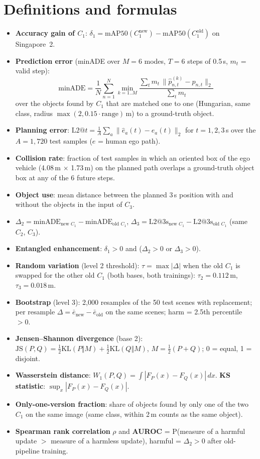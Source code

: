 \documentclass[10pt,a4paper]{article}
\begin{document}
\section{Definitions and formulas}
\begin{itemize}
\item \textbf{Accuracy gain of $C_1$}: $\delta_1 = \mathrm{mAP50}(C_1^{\text{new}}) - \mathrm{mAP50}(C_1^{\text{old}})$ on Singapore~2.
\item \textbf{Prediction error} (minADE over $M=6$ modes, $T=6$ steps of 0.5\,s, $m_t$ = valid step):
\[ \text{minADE} = \frac{1}{N}\sum_{n=1}^{N} \min_{k=1..M} \frac{\sum_t m_t \,\lVert \hat p^{(k)}_{n,t} - p_{n,t}\rVert_2}{\sum_t m_t} \]
over the objects found by $C_1$ that are matched one to one (Hungarian, same class, radius $\max(2, 0.15\cdot\text{range})$\,m) to a ground-truth object.
\item \textbf{Planning error}: $\mathrm{L2@}t = \frac{1}{A}\sum_{a} \lVert \hat e_{a}(t) - e_{a}(t) \rVert_2$ for $t = 1, 2, 3$\,s over the $A = 1{,}720$ test samples ($e$ = human ego path).
\item \textbf{Collision rate}: fraction of test samples in which an oriented box of the ego vehicle (4.08\,m $\times$ 1.73\,m) on the planned path overlaps a ground-truth object box at any of the 6 future steps.
\item \textbf{Object use}: mean distance between the planned 3\,s position with and without the objects in the input of $C_3$.
\item $\Delta_2 = \text{minADE}_{\text{new }C_1} - \text{minADE}_{\text{old }C_1}$, \quad $\Delta_3 = \text{L2@3s}_{\text{new }C_1} - \text{L2@3s}_{\text{old }C_1}$ (same $C_2$, $C_3$).
\item \textbf{Entangled enhancement}: $\delta_1 > 0$ and ($\Delta_2 > 0$ or $\Delta_3 > 0$).
\item \textbf{Random variation} (level 2 threshold): $\tau = \max |\Delta|$ when the old $C_1$ is swapped for the other old $C_1$ (both bases, both trainings): $\tau_2 = 0.112$\,m, $\tau_3 = 0.018$\,m.
\item \textbf{Bootstrap} (level 3): 2{,}000 resamples of the 50 test scenes with replacement; per resample $\Delta = \bar{e}_{\text{new}} - \bar{e}_{\text{old}}$ on the same scenes; harm = 2.5th percentile $> 0$.
\item \textbf{Jensen--Shannon divergence} (base 2): $\mathrm{JS}(P,Q) = \tfrac12 \mathrm{KL}(P\Vert M) + \tfrac12\mathrm{KL}(Q\Vert M)$, $M = \tfrac12(P+Q)$; 0 = equal, 1 = disjoint.
\item \textbf{Wasserstein distance}: $W_1(P,Q) = \int |F_P(x) - F_Q(x)|\,dx$. \textbf{KS statistic}: $\sup_x |F_P(x) - F_Q(x)|$.
\item \textbf{Only-one-version fraction}: share of objects found by only one of the two $C_1$ on the same image (same class, within 2\,m counts as the same object).
\item \textbf{Spearman rank correlation} $\rho$ and \textbf{AUROC} = P(measure of a harmful update $>$ measure of a harmless update), harmful = $\Delta_2 > 0$ after old-pipeline training.
\end{itemize}
\end{document}
